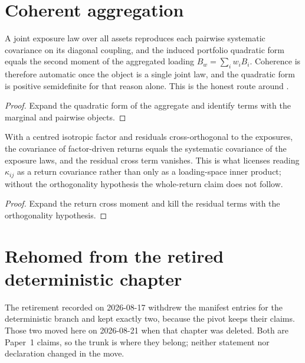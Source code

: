\section{Coherent aggregation}

\begin{theorem}
  \label{thm:joint-coherence}
  A joint exposure law over all assets reproduces each pairwise systematic
  covariance on its diagonal coupling, and the induced portfolio quadratic form
  equals the second moment of the aggregated loading
  \(B_w=\sum_i w_iB_i\).
  Coherence is therefore automatic once the object is a single joint law, and
  the quadratic form is positive semidefinite for that reason alone.
  This is the honest route around .
\end{theorem}

\begin{proof}
  Expand the quadratic form of the aggregate and identify terms with the
  marginal and pairwise objects.
\end{proof}

\begin{theorem}
  \label{thm:factor-return-semantics}
  With a centred isotropic factor and residuals cross-orthogonal to the
  exposures, the covariance of factor-driven returns equals the systematic
  covariance of the exposure laws, and the residual cross term vanishes.
  This is what licenses reading \(\kappa_{ij}\) as a return covariance rather
  than only as a loading-space inner product; without the orthogonality
  hypothesis the whole-return claim does not follow.
\end{theorem}

\begin{proof}
  Expand the return cross moment and kill the residual terms with the
  orthogonality hypothesis.
\end{proof}

\section{Rehomed from the retired deterministic chapter}

The retirement recorded on 2026-08-17 withdrew the manifest entries for the
deterministic branch and kept exactly two, because the pivot keeps their claims.
Those two moved here on 2026-08-21 when that chapter was deleted.
Both are Paper~1 claims, so the trunk is where they belong; neither statement
nor declaration changed in the move.

